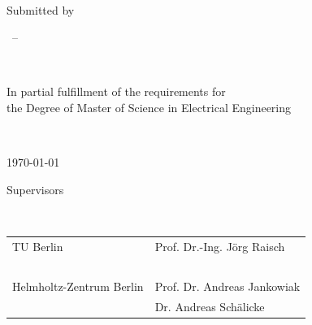 \begin{titlingpage}
	\vfill

	\begin{center}
	\LARGE \textsc{\thesubject}
	\end{center}

	~

	\begin{Spacing}{3}
		\centering\textsc{\huge\thetitle}
	\end{Spacing}

	\vfill

	\centering
	Submitted by


	\theauthor  ~-- \theauthorinfo

	~

	In partial fulfillment of the requirements for \\ the Degree of Master of Science in Electrical Engineering

	~


	\today

	\vfill


	Supervisors

	~

	\setlength{\tabcolsep}{15pt}
    \renewcommand\arraystretch{.7}
	\begin{tabular}{l l}
		TU Berlin
		&Prof. Dr.-Ing. Jörg Raisch \\
	    ~ & ~\\
			Helmholtz-Zentrum Berlin
		& Prof. Dr. Andreas Jankowiak \\
		~ & Dr. Andreas Schälicke
	\end{tabular}
\end{titlingpage}
